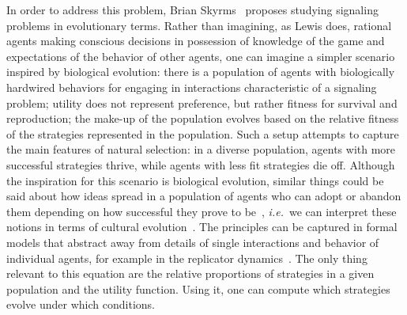 \documentclass[a4paper]{article}
\begin{document}
In order to address this problem, Brian Skyrms~\parencite*{skyrms_evolution_1996} proposes studying signaling problems in evolutionary terms.
Rather than imagining, as Lewis does, rational agents making conscious decisions in possession of knowledge of the game and expectations of the behavior of other agents, one can imagine a simpler scenario inspired by biological evolution: there is a population of agents with biologically hardwired behaviors for engaging in interactions characteristic of a signaling problem; utility does not represent preference, but rather fitness for survival and reproduction; the make-up of the population evolves based on the relative fitness of the strategies represented in the population.
Such a setup attempts to capture the main features of natural selection: in a diverse population, agents with more successful strategies thrive, while agents with less fit strategies die off.
Although the inspiration for this scenario is biological evolution, similar things could be said about how ideas spread in a population of agents who can adopt or abandon them depending on how successful they prove to be~\parencite[\emph{e.g.}][]{BenzJager2006:Game-Theory-and,Pagel2009:Human-Language-,ThompsonKirby2016:Culture-Shapes-}, \emph{i.e.}~we can interpret these notions in terms of cultural evolution~\parencite{dawkins_selfish_1978,boyd_culture_1985}.
The principles can be captured in formal models that abstract away from details of single interactions and behavior of individual agents, for example in the replicator dynamics~\parencite{TaylorJonker1978:Evolutionary-St}.
The only thing relevant to this equation are the relative proportions of strategies in a given population and the utility function.
Using it, one can compute which strategies evolve under which conditions.
\end{document}
